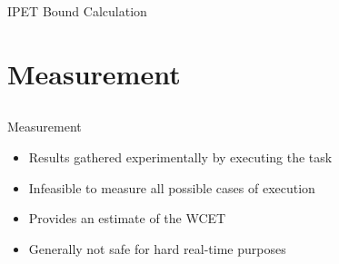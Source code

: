 \documentclass{beamer}
\begin{document}
\begin{frame}{IPET Bound Calculation}
  
\end{frame}

\section{Measurement}
\subsection{}
\begin{frame}{Measurement}
  \begin{itemize}
    \item Results gathered experimentally by executing the task
    \item Infeasible to measure all possible cases of execution
    \item Provides an estimate of the WCET
    \item Generally not safe for hard real-time purposes
  \end{itemize}
\end{frame}
\end{document}
